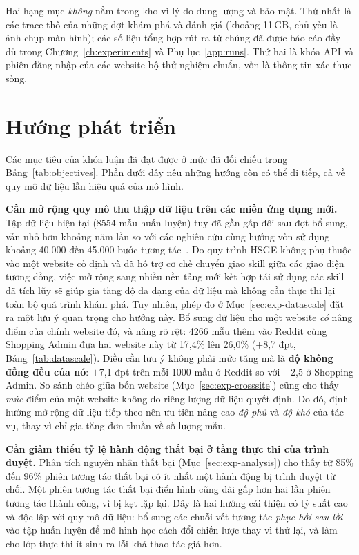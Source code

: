 Hai hạng mục \emph{không} nằm trong kho vì lý do dung lượng và bảo mật. Thứ
nhất là các trace thô của những đợt khám phá và đánh giá (khoảng 11\,GB, chủ
yếu là ảnh chụp màn hình); các số liệu tổng hợp rút ra từ chúng đã được báo
cáo đầy đủ trong Chương~\ref{ch:experiments} và Phụ lục~\ref{app:runs}. Thứ
hai là khóa API và phiên đăng nhập của các website bộ thử nghiệm chuẩn, vốn là thông
tin xác thực sống.

\section{Hướng phát triển}
\label{sec:conc-future}

Các mục tiêu của khóa luận đã đạt được ở mức đã đối chiếu trong Bảng~\ref{tab:objectives}. Phần dưới đây nêu những hướng
còn có thể đi tiếp, cả về quy mô dữ liệu lẫn hiệu quả của mô hình.

\textbf{Cần mở rộng quy mô thu thập dữ liệu trên các miền ứng dụng mới.}
Tập dữ liệu hiện tại (8554 mẫu huấn luyện) tuy đã gần gấp đôi sau đợt bổ
sung, vẫn nhỏ hơn khoảng năm lần so với các nghiên cứu cùng hướng vốn sử dụng
khoảng 40.000 đến 45.000 bước tương
tác~\cite{murty2024nnetnav,gandhi2026gobrowse}. Do quy trình HSGE không phụ thuộc vào một website cố định và đã hỗ trợ
cơ chế chuyển giao skill giữa các giao diện tương đồng, việc mở rộng sang
nhiều nền tảng mới kết hợp tái sử dụng các skill đã tích lũy sẽ giúp gia tăng
độ đa dạng của dữ liệu mà không cần thực thi lại toàn bộ quá trình khám phá.
Tuy nhiên, phép đo ở Mục~\ref{sec:exp-datascale} đặt ra một lưu ý quan
trọng cho hướng này. Bổ sung dữ liệu cho một website \emph{có} nâng điểm của
chính website đó, và nâng rõ rệt: 4266 mẫu thêm vào Reddit cùng Shopping Admin
đưa hai website này từ 17{,}4\% lên 26{,}0\% ($+$8{,}7 đpt,
Bảng~\ref{tab:datascale}). Điều cần lưu ý không phải mức tăng mà là \textbf{độ
không đồng đều của nó}: $+$7{,}1 đpt trên mỗi 1000 mẫu ở Reddit so với $+$2{,}5
ở Shopping Admin. So sánh chéo giữa bốn website (Mục~\ref{sec:exp-crosssite})
cũng cho thấy \emph{mức} điểm của một website không do riêng lượng dữ liệu
quyết định. Do đó, định hướng mở rộng dữ liệu tiếp theo nên ưu tiên nâng cao
\emph{độ phủ} và \emph{độ khó} của tác vụ, thay vì chỉ gia tăng đơn thuần về số
lượng mẫu.

\textbf{Cần giảm thiểu tỷ lệ hành động thất bại ở tầng thực thi của trình duyệt.}
Phân tích nguyên nhân thất bại (Mục~\ref{sec:exp-analysis}) cho thấy từ
85\% đến 96\% phiên tương tác thất bại có ít nhất một hành động bị trình duyệt từ
chối. Một phiên tương tác thất bại điển hình cũng dài gấp hơn hai lần phiên tương tác thành
công, vì bị kẹt lặp lại. Đây là hai hướng cải thiện có tỷ suất cao và độc lập với
quy mô dữ liệu: bổ sung các chuỗi vết tương tác \emph{phục hồi sau lỗi} vào tập huấn
luyện để mô hình học cách đổi chiến lược thay vì thử lại, và làm cho lớp
thực thi ít sinh ra lỗi khả thao tác giả hơn.

